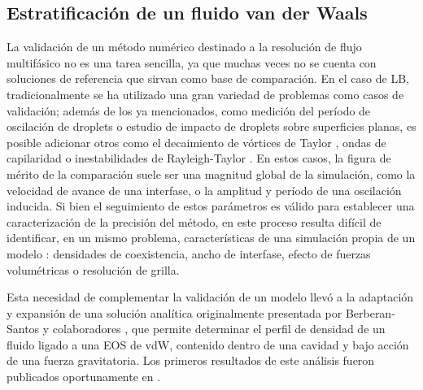 \subsection{Estratificaci\'on de un fluido van der Waals}
\label{sec:vdw_1d}

La validaci\'on de un m\'etodo num\'erico destinado a la resoluci\'on de flujo multif\'asico no es una tarea sencilla, ya que muchas veces no se cuenta con soluciones de referencia que sirvan como base de comparaci\'on. En el caso de LB, tradicionalmente se ha utilizado una gran variedad de problemas como casos de validaci\'on; adem\'as de los ya mencionados, como medici\'on del per\'iodo de oscilaci\'on de droplets o estudio de impacto de droplets sobre superficies planas, es posible adicionar otros como el decaimiento de v\'ortices de Taylor \cite{guo_discrete_2002}, ondas de capilaridad \cite{mccracken_multiple-relaxation-time_2005} o inestabilidades de Rayleigh-Taylor \cite{li_additional_2012}. En estos casos, la figura de m\'erito de la comparaci\'on suele ser una magnitud global de la simulaci\'on, como la velocidad de avance de una interfase, o la amplitud y per\'iodo de una oscilaci\'on inducida. Si bien el seguimiento de estos par\'ametros es v\'alido para establecer una caracterizaci\'on de la precisi\'on del m\'etodo, en este proceso resulta dif\'icil de identificar, en un mismo problema, caracter\'isticas de una simulaci\'on propia de un modelo \pp{}: densidades de coexistencia, ancho de interfase, efecto de fuerzas volum\'etricas o resoluci\'on de grilla.

Esta necesidad de complementar la validaci\'on de un modelo \pp{} llev\'o a la adaptaci\'on y expansi\'on de una soluci\'on anal\'itica originalmente presentada por Berberan-Santos y colaboradores \cite{berberan-santos_liquidvapor_2002}, que permite determinar el perfil de densidad de un fluido ligado a una EOS de vdW, contenido dentro de una cavidad y bajo acci\'on de una fuerza gravitatoria.  Los primeros resultados de este an\'alisis fueron publicados oportunamente en \cite{fogliatto_simulation_2019}.

